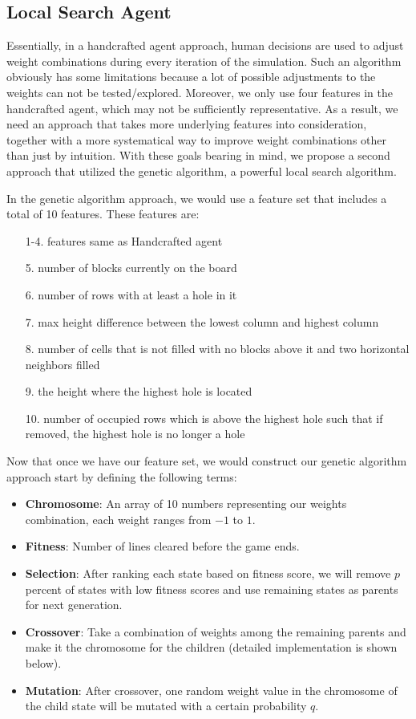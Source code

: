 \documentclass[letterpaper]{article} %
\begin{document}
\subsection{Local Search Agent}
Essentially, in a handcrafted agent approach, human decisions are used to adjust weight combinations during every iteration of the simulation. Such an algorithm obviously has some limitations because a lot of possible adjustments to the weights can not be tested/explored. Moreover, we only use four features in the handcrafted agent, which may not be sufficiently representative. As a result, we need an approach that takes more underlying features into consideration, together with a more systematical way to improve weight combinations other than just by intuition. With these goals bearing in mind, we propose a second approach that utilized the genetic algorithm, a powerful local search algorithm.

In the genetic algorithm approach, we would use a feature set that includes a total of 10 features. These features are:
\begin{enumerate}
 \item[1-4.] features same as Handcrafted agent
 \item[5.] number of blocks currently on the board
 \item[6.] number of rows with at least a hole in it
 \item[7.] max height difference between the lowest column and highest column
 \item[8.] number of cells that is not filled with no blocks above it and two horizontal neighbors filled
 \item[9.] the height where the highest hole is located
 \item[10.] number of occupied rows which is above the highest hole such that if removed, the highest hole is no longer a hole
\end{enumerate}

Now that once we have our feature set, we would construct our genetic algorithm approach start by defining the following terms:

\begin{itemize}
 \item {\bf Chromosome}: An array of 10 numbers representing our weights combination, each weight ranges from $-1$ to $1$.
 \item {\bf Fitness}: Number of lines cleared before the game ends.
 \item {\bf Selection}: After ranking each state based on fitness score, we will remove $p$ percent of states with low fitness scores and use remaining states as parents for next generation.
 \item {\bf Crossover}: Take a combination of weights among the remaining parents and make it the chromosome for the children (detailed implementation is shown below).
 \item {\bf Mutation}: After crossover, one random weight value in the chromosome of the child state will be mutated with a certain probability $q$.
\end{itemize}
\end{document}
